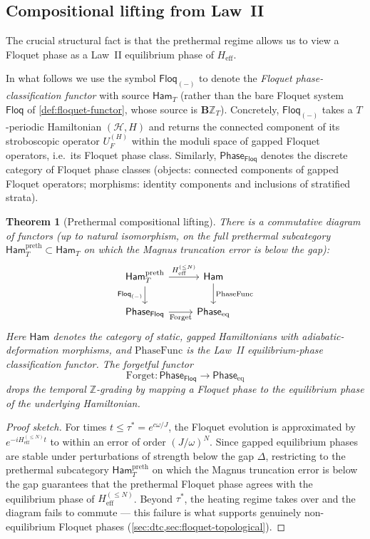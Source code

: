 \documentclass[12pt]{article}
\newtheorem{theorem}{Theorem}[section]
\theoremstyle{definition}
\theoremstyle{remark}
\newcommand{\Hcal}{\mathcal{H}}
\newcommand{\Z}{\mathbb{Z}}
\newcommand{\Heff}{H_{\mathrm{eff}}}
\newcommand{\Floq}{\mathsf{Floq}}
\newcommand{\Ham}{\mathsf{Ham}}
\newcommand{\Phase}{\mathsf{Phase}}
\begin{document}
\subsection{Compositional lifting from Law~II}

The crucial structural fact is that the prethermal regime allows us to view a Floquet phase as a Law~II equilibrium phase of $\Heff$.

In what follows we use the symbol $\Floq_{(-)}$ to denote the \emph{Floquet phase-classification functor} with source $\Ham_T$ (rather than the bare Floquet system $\Floq$ of \cref{def:floquet-functor}, whose source is $\mathbf{B}\Z_T$). Concretely, $\Floq_{(-)}$ takes a $T$-periodic Hamiltonian $(\Hcal,H)$ and returns the connected component of its stroboscopic operator $U_F^{(H)}$ within the moduli space of gapped Floquet operators, i.e.\ its Floquet phase class. Similarly, $\Phase_{\Floq}$ denotes the discrete category of Floquet phase classes (objects: connected components of gapped Floquet operators; morphisms: identity components and inclusions of stratified strata).

\begin{theorem}[Prethermal compositional lifting]
\label{thm:prethermal-lift}
There is a commutative diagram of functors (up to natural isomorphism, on the full prethermal subcategory $\Ham_T^{\mathrm{preth}}\subset\Ham_T$ on which the Magnus truncation error is below the gap):
\begin{equation}
\begin{tikzcd}
\Ham_T^{\mathrm{preth}} \arrow[r,"\Heff^{(\leq N)}"] \arrow[d,"\Floq_{(-)}"'] & \Ham \arrow[d,"\mathrm{PhaseFunc}"]\\
\Phase_{\Floq} \arrow[r,"\mathrm{Forget}"'] & \Phase_{\mathrm{eq}}
\end{tikzcd}
\end{equation}
Here $\Ham$ denotes the category of static, gapped Hamiltonians with adiabatic-deformation morphisms, and $\mathrm{PhaseFunc}$ is the Law~II equilibrium-phase classification functor. The forgetful functor
\begin{equation*}
\mathrm{Forget}\colon\Phase_{\Floq}\to\Phase_{\mathrm{eq}}
\end{equation*}
drops the temporal $\Z$-grading by mapping a Floquet phase to the equilibrium phase of the underlying Hamiltonian.
\end{theorem}

\begin{proof}[Proof sketch]
For times $t\leq\tau^*=e^{c\omega/J}$, the Floquet evolution is approximated by $e^{-i\Heff^{(\leq N)} t}$ to within an error of order $(J/\omega)^N$. Since gapped equilibrium phases are stable under perturbations of strength below the gap $\Delta$, restricting to the prethermal subcategory $\Ham_T^{\mathrm{preth}}$ on which the Magnus truncation error is below the gap guarantees that the prethermal Floquet phase agrees with the equilibrium phase of $\Heff^{(\leq N)}$. Beyond $\tau^*$, the heating regime takes over and the diagram fails to commute --- this failure is what supports genuinely non-equilibrium Floquet phases (\cref{sec:dtc,sec:floquet-topological}).
\end{proof}
\end{document}

